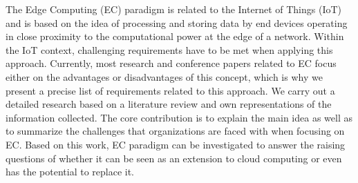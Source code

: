 The Edge Computing (EC) paradigm is related to the Internet of Things (IoT) and is based on the idea of processing and storing data by end devices operating in close proximity to the computational power at the edge of a network. Within the IoT context, challenging requirements have to be met when applying this approach. Currently, most research and conference papers related to EC focus either on the advantages or disadvantages of this concept, which is why we present a precise list of requirements related to this approach. We carry out a detailed research based on a literature review and own representations of the information collected. The core contribution is to explain the main idea as well as to summarize the challenges that organizations are faced with when focusing on EC. Based on this work, EC paradigm can be investigated to answer the raising questions of whether it can be seen as an extension to cloud computing or even has the potential to replace it.